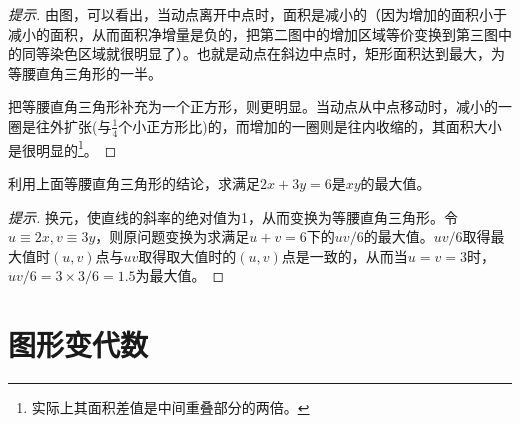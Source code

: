 \begin{proof}[提示]
  由图，可以看出，当动点离开中点时，面积是减小的（因为增加的面积小于减小的面积，从而面积净增量是负的，把第二图中的增加区域等价变换到第三图中的同等染色区域就很明显了）。也就是动点在斜边中点时，矩形面积达到最大，为等腰直角三角形的一半。

  \begin{center}
  \end{center}

  把等腰直角三角形补充为一个正方形，则更明显。当动点从中点移动时，减小的一圈是往外扩张(与$\frac14$个小正方形比)的，而增加的一圈则是往内收缩的，其面积大小是很明显的\footnote{实际上其面积差值是中间重叠部分的两倍。}。
\end{proof}

\begin{example}
  利用上面等腰直角三角形的结论，求满足$2x+3y=6$是$xy$的最大值。
\end{example}
\begin{proof}[提示]
  换元，使直线的斜率的绝对值为1，从而变换为等腰直角三角形。令$u\equiv2x, v\equiv3y$，则原问题变换为求满足$u+v=6$下的$uv/6$的最大值。$uv/6$取得最大值时$(u,v)$点与$uv$取得取大值时的$(u,v)$点是一致的，从而当$u=v=3$时，$uv/6=3\times3/6=1.5$为最大值。
\end{proof}

\section{图形变代数}
\label{sec:graph-to-algebra}


